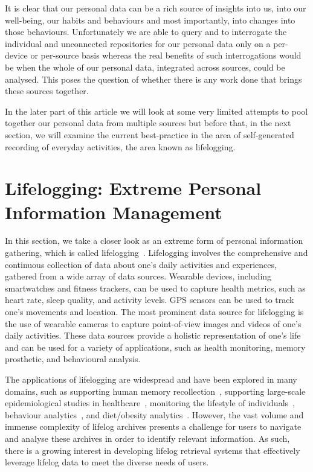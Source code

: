 \documentclass[11pt]{article}
\begin{document}
It is clear that our personal data can be a rich source of insights into us, into our well-being, our habits and behaviours and most importantly, into changes into those behaviours. Unfortunately we are able to query and to interrogate the individual and unconnected repositories for our personal data only on a per-device or per-source basis whereas the real benefits of such interrogations would be when the whole of our personal data, integrated across sources, could be analysed.  This poses the question of whether there is any work done that brings these sources together. 

In the later part of this article we will look at some very limited attempts to pool together our personal data from multiple sources but before that, in the next section, we will examine the current best-practice in the area of self-generated recording of everyday activities, the area known as lifelogging.


\section{Lifelogging: Extreme Personal Information Management}

In this section, we take a closer look as an extreme form of personal information gathering, which is called lifelogging~\cite{INR-033}. Lifelogging involves the comprehensive and continuous collection of data about one's daily activities and experiences, gathered from a wide array of data sources. Wearable devices, including smartwatches and fitness trackers, can be used to capture health metrics, such as heart rate, sleep quality, and activity levels. GPS sensors can be used to track one's movements and location. The most prominent data source for lifelogging is the use of wearable cameras to capture point-of-view images and videos of one's daily activities. These data sources provide a holistic representation of one's life and can be used for a variety of applications, such as health monitoring, memory prosthetic, and behavioural analysis.

The applications of lifelogging are widespread  and have been explored in many domains, such as supporting human memory recollection~\cite{barnard2011exploring,berry2007use,harvey2016remembering}, supporting large-scale epidemiological studies in healthcare~\cite{signal2017children}, monitoring the lifestyle of individuals~\cite{wilson2018use,nguyen2016recognition}, behaviour analytics~\cite{everson2019can}, and diet/obesity analytics~\cite{zhou2019use}. However, the vast volume and immense complexity of lifelog archives presents a challenge for users to navigate and analyse these archives in order to identify relevant information. As such, there is a growing interest in developing lifelog retrieval systems that effectively leverage lifelog data to meet the diverse needs of users.
\end{document}

